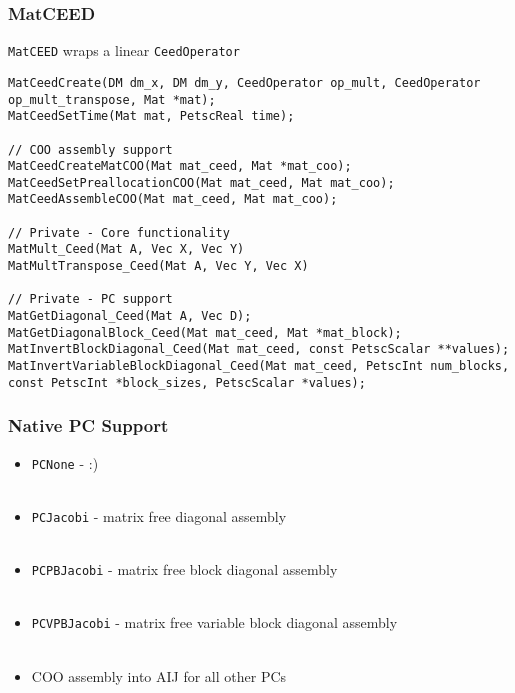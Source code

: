\documentclass{beamer}
\begin{document}
\begin{frame}[fragile]
\begin{center}
\frametitle{MatCEED}

\lstinline{MatCEED} wraps a linear \lstinline{CeedOperator}

{\tiny
\begin{lstlisting}[style=boxedC]
MatCeedCreate(DM dm_x, DM dm_y, CeedOperator op_mult, CeedOperator op_mult_transpose, Mat *mat);
MatCeedSetTime(Mat mat, PetscReal time);

// COO assembly support
MatCeedCreateMatCOO(Mat mat_ceed, Mat *mat_coo);
MatCeedSetPreallocationCOO(Mat mat_ceed, Mat mat_coo);
MatCeedAssembleCOO(Mat mat_ceed, Mat mat_coo);

// Private - Core functionality
MatMult_Ceed(Mat A, Vec X, Vec Y)
MatMultTranspose_Ceed(Mat A, Vec Y, Vec X)

// Private - PC support
MatGetDiagonal_Ceed(Mat A, Vec D);
MatGetDiagonalBlock_Ceed(Mat mat_ceed, Mat *mat_block);
MatInvertBlockDiagonal_Ceed(Mat mat_ceed, const PetscScalar **values);
MatInvertVariableBlockDiagonal_Ceed(Mat mat_ceed, PetscInt num_blocks, const PetscInt *block_sizes, PetscScalar *values);

\end{lstlisting}
}

\end{center}
\end{frame}


\begin{frame}
\begin{center}
\frametitle{Native PC Support}

\begin{itemize}

\item \lstinline{PCNone} - :)\\

~\\

\item \lstinline{PCJacobi} - matrix free diagonal assembly\\

~\\

\item \lstinline{PCPBJacobi} - matrix free block diagonal assembly\\

~\\

\item \lstinline{PCVPBJacobi} - matrix free variable block diagonal assembly\\

~\\

\item COO assembly into AIJ for all other PCs

\end{itemize}

\end{center}
\end{frame}
\end{document}
